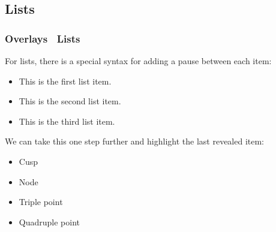 \documentclass[UKenglish, unknownkeysallowed]{beamer}
\begin{document}
\subsection{Lists}


\begin{frame}
    \frametitle{Overlays \textthreequartersemdash\ Lists}

    For lists, there is a special syntax for adding a pause between each item:

    \begin{itemize}[<+->]
        \item
        This is the first list item.

        \item
        This is the second list item.

        \item
        This is the third list item.
    \end{itemize}

    \pause
    We can take this one step further and highlight the last revealed item:

    \begin{itemize}[<+-| alert@+>]
        \item
        Cusp

        \item
        Node

        \item
        Triple point

        \item
        Quadruple point
    \end{itemize}


\end{frame}
\end{document}
